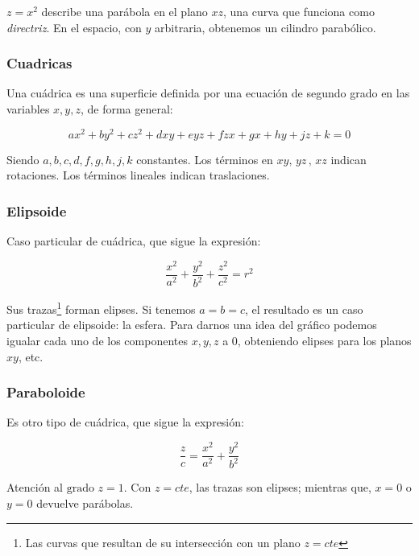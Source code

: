 \(z = x^{2}\) describe una parábola en el plano \(xz\),
una curva que funciona como \textit{directriz}.
En el espacio, con \(y\) arbitraria, obtenemos un cilindro parabólico.

\subsubsection{Cuadricas}

Una cuádrica es una superficie definida por una ecuación de segundo grado en las
variables \(x, y, z\), de forma general:

\begin{equation*}
    ax^{2} + by^{2} + cz^{2} + dxy + eyz + fzx + gx + hy + jz + k = 0
\end{equation*}

Siendo \(a, b, c, d, f, g, h, j, k\) constantes.
Los términos en \(xy,\,yz\,,\,xz\) indican rotaciones.
Los términos lineales indican traslaciones.

\subsubsection{Elipsoide}

Caso particular de cuádrica, que sigue la expresión:

\begin{equation*}
    \frac{x^{2}}{a^{2}} + \frac{y^{2}}{b^{2}} + \frac{z^{2}}{c^{2}} = r^{2}
\end{equation*}

Sus trazas\footnote{Las curvas que resultan de su intersección con un plano \(z = cte\)}
forman elipses.
Si tenemos \(a = b = c\), el resultado es un caso particular de elipsoide:
la esfera.
Para darnos una idea del gráfico podemos igualar cada uno de los componentes
\(x, y, z\) a 0, obteniendo elipses para los planos \(xy\), etc.


\subsubsection{Paraboloide}

Es otro tipo de cuádrica, que sigue la expresión:

\begin{equation*}
    \frac{z}{c} = \frac{x^{2}}{a^{2}} + \frac{y^{2}}{b^{2}}
\end{equation*}

Atención al \(\text{grado }z = 1\).
Con \(z = cte\), las trazas son elipses;
mientras que, \(x = 0\) o \(y = 0\) devuelve parábolas.

